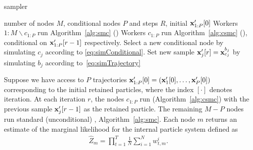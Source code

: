 \begin{algorithm}[tb]
	\caption{\ipmcmc sampler}
	\label{alg:ipmc}
	\begin{spacing}{1.2}
	\begin{algorithmic}[1]
		 number of nodes $M$, conditional nodes $P$ and \mcmc steps $R$, initial $\mathbf{x}_{1:P}'[0]$
		\STATE Workers $1:M \backslash c_{1:P}$ run Algorithm~\ref{alg:smc} (\smc)
		\STATE Workers $c_{1:P}$ run Algorithm~\ref{alg:csmc} (\csmc), conditional on $\mathbf{x}_{1:P}'[r-1]$ respectively.
		\STATE Select a new conditional node by simulating $c_j$ according to \eqref{eq:simConditional}. %
		\STATE Set new \mcmc sample $\mathbf{x}_j'[r] = \mathbf{x}_{c_j}^{b_j}$ by simulating $b_j$ according to~\eqref{eq:simTrajectory}
		\ENDFOR
		\ENDFOR
	\end{algorithmic}
\end{spacing}
\end{algorithm}

Suppose we have access to $P$ trajectories ${\mathbf{x}_{1:P}'[0]=(\mathbf{x}_1'[0],\ldots,\mathbf{x}_P'[0])}$ corresponding to the initial retained particles, where the index $[\cdot]$ denotes \mcmc iteration. At each iteration $r$, the nodes $c_{1:P}$ run \csmc (Algorithm~\ref{alg:csmc}) with the previous \mcmc sample $\mathbf{x}_j'[r-1]$ as the retained particle. The remaining $M-P$ nodes run standard (unconditional) \smc, \ie Algorithm~\ref{alg:smc}.  Each node $m$ returns an estimate of the marginal likelihood for the internal particle system defined as
\begin{align}
\label{eq:ML}
\hat Z_{m} = \prod_{t=1}^T \frac{1}{N} \sum_{i=1}^N w_{t,m}^{i}.
\end{align}

